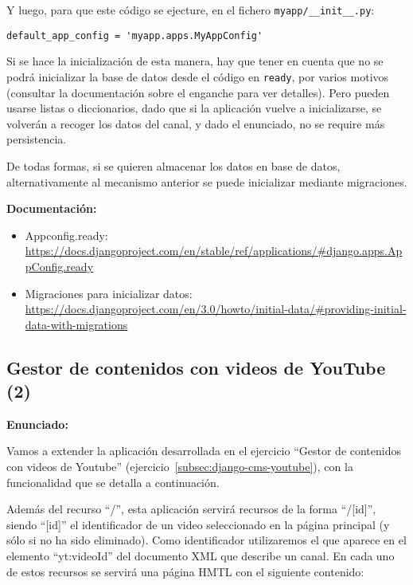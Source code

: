 Y luego, para que este código se ejecture, en el fichero \verb|myapp/__init__.py|:

\begin{verbatim}
default_app_config = 'myapp.apps.MyAppConfig'
\end{verbatim}

Si se hace la inicialización de esta manera, hay que tener en cuenta que no se podrá inicializar la base de datos desde el código en \verb|ready|, por varios motivos (consultar la documentación sobre el enganche para ver detalles). Pero pueden usarse listas o diccionarios, dado que si la aplicación vuelve a inicializarse, se volverán a recoger los datos del canal, y dado el enunciado, no se require más persistencia.

De todas formas, si se quieren almacenar los datos en base de datos, alternativamente al mecanismo anterior se puede inicializar mediante migraciones.

\textbf{Documentación:}

\begin{itemize}
\item Appconfig.ready: \\
\url{https://docs.djangoproject.com/en/stable/ref/applications/#django.apps.AppConfig.ready}

\item Migraciones para inicializar datos: \\
\url{https://docs.djangoproject.com/en/3.0/howto/initial-data/#providing-initial-data-with-migrations}
\end{itemize}

\subsection{Gestor de contenidos con videos de YouTube (2)}
\label{subsec:django-cms-youtube-2}

\textbf{Enunciado:}

Vamos a extender la aplicación desarrollada en el ejercicio ``Gestor de contenidos con videos de Youtube'' (ejercicio~\ref{subsec:django-cms-youtube}), con la funcionalidad que se detalla a continuación.

Además del recurso ``/'', esta aplicación servirá recursos de la forma ``/[id]'', siendo ``[id]'' el identificador de un video seleccionado en la página principal (y sólo si no ha sido eliminado). Como identificador utilizaremos el que aparece en el elemento ``yt:videoId'' del documento XML que describe un canal. En cada uno de estos recursos se servirá una página HMTL con el siguiente contenido:

